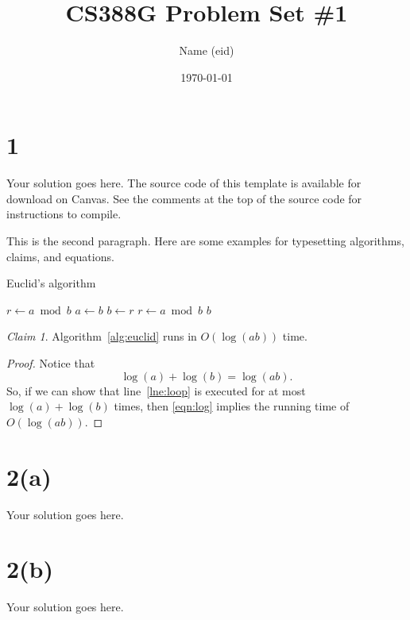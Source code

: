 \documentclass[letterpaper,12pt]{article}
\theoremstyle{remark}
\newtheorem{claim}{Claim}
\begin{document}
\title{CS388G Problem Set \#1}
\date{\today}
\author{Name (eid)}
\maketitle

\section*{1}

Your solution goes here. The source code of this template is available for
download on Canvas. See the comments at the top of the source code for
instructions to compile.

This is the second paragraph. Here are some examples for typesetting algorithms,
claims, and equations.

\begin{algorithm}
\caption{Euclid's algorithm} \label{alg:euclid}
\begin{algorithmic}[1]
  \State $r \gets a \bmod b$
   \label{lne:loop}
    \State $a \gets b$
    \State $b \gets r$
    \State $r \gets a \bmod b$
  \EndWhile
  \State \Return $b$ 
\EndFunction
\end{algorithmic}
\end{algorithm}

\begin{claim} \label{clm:time}
Algorithm~\ref{alg:euclid} runs in $O( \log(a b) )$ time.
\end{claim}

\begin{proof}
Notice that
\begin{equation}
\log(a) + \log(b) = \log(a b). \label{eqn:log}
\end{equation}
So, if we can show that line~\ref{lne:loop} is executed for at most
$\log(a) + \log(b)$ times, then \eqref{eqn:log} implies the running time of
$O( \log(a b) )$.
\end{proof}

\clearpage{}
\section*{2(a)}

Your solution goes here.

\clearpage{}
\section*{2(b)}

Your solution goes here.


\end{document}
